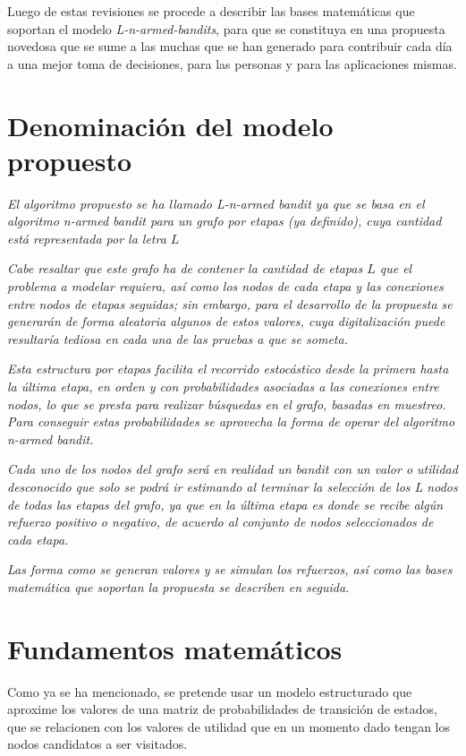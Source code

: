 Luego de estas revisiones se procede a describir las bases matemáticas que soportan el modelo \textit{L-n-armed-bandits}, para que se constituya en una propuesta novedosa que se sume a las muchas que se han generado para contribuir cada día a una mejor toma de decisiones, para las personas y para las aplicaciones mismas.

\section{Denominación del modelo propuesto}
\label{nombre}

\textit{El algoritmo propuesto se ha llamado \textit{L-n-armed bandit} ya que se basa en el algoritmo \textit{n-armed bandit} para un grafo por etapas (ya definido), cuya cantidad está representada por la letra $L$}

\textit{Cabe resaltar que este grafo ha de contener la cantidad de etapas $L$ que el problema a modelar requiera, así como los nodos de cada etapa y las conexiones entre nodos de etapas seguidas; sin embargo, para el desarrollo de la propuesta se generarán de forma aleatoria algunos de estos valores, cuya digitalización puede resultaría tediosa en cada una de las pruebas a que se someta.}

\textit{Esta estructura por etapas facilita el recorrido estocástico desde la primera hasta la última etapa, en orden y con probabilidades asociadas a las conexiones entre nodos, lo que se presta para realizar búsquedas en el grafo, basadas en muestreo. Para conseguir estas probabilidades se aprovecha la forma de operar del algoritmo \textit{n-armed bandit}.}

\textit{Cada uno de los nodos del grafo será en realidad un \textit{bandit} con un valor o utilidad desconocido que solo se podrá ir estimando al terminar la selección de los L nodos de todas las etapas del grafo, ya que en la última etapa es donde se recibe algún refuerzo positivo o negativo, de acuerdo al conjunto de nodos seleccionados de cada etapa.}

\textit{Las forma como se generan valores y se simulan los refuerzos, así como las bases matemática que soportan la propuesta se describen en seguida.}

\section{Fundamentos matemáticos}

Como ya se ha mencionado, se pretende usar un modelo estructurado que aproxime los valores de una matriz de probabilidades de transición de estados, que se relacionen con los valores de utilidad que en un momento dado tengan los nodos candidatos a ser visitados.

